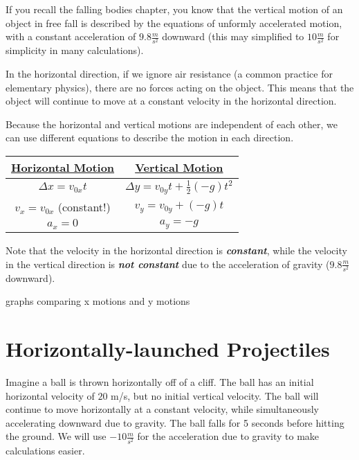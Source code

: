 If you recall the falling bodies chapter, you know that the vertical motion of an object in free fall is described by the equations of unformly accelerated motion, with a constant acceleration of $9.8 \frac{m}{s^2}$ downward (this may simplified to $10 \frac{m}{s^2}$ for simplicity in many calculations).

In the horizontal direction, if we ignore air resistance (a common practice for elementary physics), there are no forces acting on the object. This means that the object will continue to move at a constant velocity in the horizontal direction.

Because the horizontal and vertical motions are independent of each other, we can use different equations to describe the motion in each direction.

\begin{center}
    \begin{table}[]
    \begin{tabular}{|c| c|}
        \underline{Horizontal Motion}       & \underline{Vertical Motion}  \\
        \hline
    
    $\Delta x = v_{0x} t$      & $\Delta y = v_{0y} t + \frac{1}{2} (-g) t^2$  \\
    $v_x = v_{0x}$ (constant!) & $v_y = v_{0y} + (-g) t$   \\
    $a_x = 0$                & $a_y = -g$ 
    
    \end{tabular}
    \end{table}
    
\end{center}

Note that the velocity in the horizontal direction is \emph{\textbf{constant}}, while the velocity in the vertical direction is \emph{\textbf{not constant}} due to the acceleration of gravity ($9.8 \frac{m}{s^2}$ downward).

graphs comparing x motions and y motions

\section{Horizontally-launched Projectiles}
Imagine a ball is thrown horizontally off of a cliff. The ball has an initial horizontal velocity of $20$ m/s, but no initial vertical velocity. The ball will continue to move horizontally at a constant velocity, while simultaneously accelerating downward due to gravity. The ball falls for 5 seconds before hitting the ground. We will use $-10 \frac{m}{s^2}$ for the acceleration due to gravity to make calculations easier.

